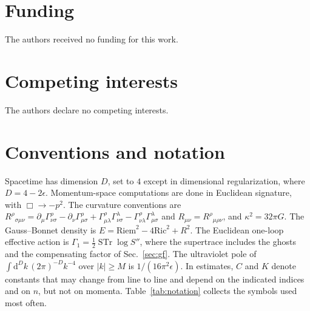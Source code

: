 \documentclass[a4paper,11pt]{article}
\newcommand{\dd}{\mathrm{d}}
\newcommand{\Ric}{\mathrm{Ric}}
\newcommand{\Riem}{\mathrm{Riem}}
\begin{document}
\section*{Funding}

The authors received no funding for this work.

\section*{Competing interests}

The authors declare no competing interests.

\appendix

\section{Conventions and notation}
\label{app:conventions}

Spacetime has dimension $D$, set to $4$ except in dimensional regularization, where $D=4-2\epsilon$. Momentum-space computations are done in Euclidean signature, with $\Box\to-p^2$. The curvature conventions are $R^\rho{}_{\sigma\mu\nu}=\partial_\mu\Gamma^\rho_{\nu\sigma}-\partial_\nu\Gamma^\rho_{\mu\sigma}+\Gamma^\rho_{\mu\lambda}\Gamma^\lambda_{\nu\sigma}-\Gamma^\rho_{\nu\lambda}\Gamma^\lambda_{\mu\sigma}$ and $R_{\mu\nu}=R^\rho{}_{\mu\rho\nu}$, and $\kappa^2=32\pi G$. The Gauss--Bonnet density is $E=\Riem^2-4\Ric^2+R^2$. The Euclidean one-loop effective action is $\Gamma_1=\frac12\operatorname{STr}\log S''$, where the supertrace includes the ghosts and the compensating factor of Sec.~\ref{sec:gf}. The ultraviolet pole of $\int\dd^Dk\,(2\pi)^{-D}k^{-4}$ over $|k|\ge M$ is $1/(16\pi^2\epsilon)$. In estimates, $C$ and $K$ denote constants that may change from line to line and depend on the indicated indices and on $n$, but not on momenta. Table~\ref{tab:notation} collects the symbols used most often.
\end{document}
